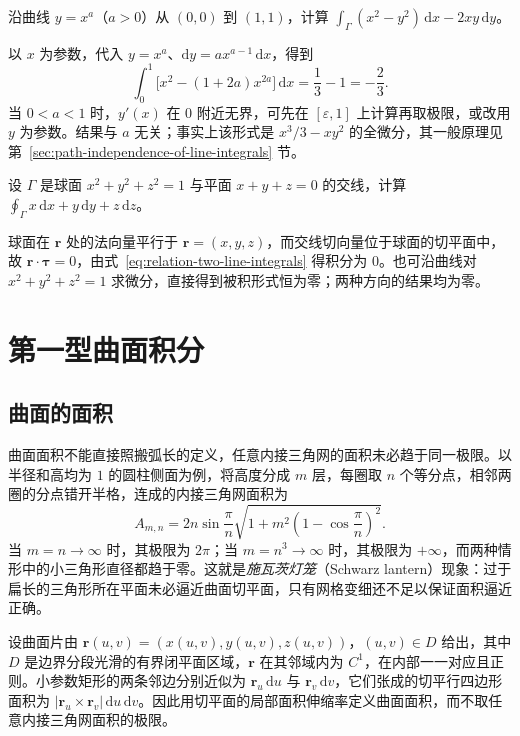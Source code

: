 \begin{example}
\label{ex:second-line-integral-variable-path}
沿曲线 $y=x^a$（$a>0$）从 $(0,0)$ 到 $(1,1)$，计算 $\int_\Gamma(x^2-y^2)\,\mathrm dx-2xy\,\mathrm dy$。
\end{example}
\begin{solve}
以 $x$ 为参数，代入 $y=x^a$、$\mathrm dy=ax^{a-1}\,\mathrm dx$，得到
\[
    \int_0^1\bigl[x^2-(1+2a)x^{2a}\bigr]\,\mathrm dx
    =\frac13-1=-\frac23.
\]
当 $0<a<1$ 时，$y'(x)$ 在 $0$ 附近无界，可先在 $[\varepsilon,1]$ 上计算再取极限，或改用 $y$ 为参数。结果与 $a$ 无关；事实上该形式是 $x^3/3-xy^2$ 的全微分，其一般原理见第~\ref{sec:path-independence-of-line-integrals} 节。
\end{solve}

\begin{example}
\label{ex:second-line-integral-sphere-circle}
设 $\Gamma$ 是球面 $x^2+y^2+z^2=1$ 与平面 $x+y+z=0$ 的交线，计算 $\oint_\Gamma x\,\mathrm dx+y\,\mathrm dy+z\,\mathrm dz$。
\end{example}
\begin{solve}
球面在 $\boldsymbol r$ 处的法向量平行于 $\boldsymbol r=(x,y,z)$，而交线切向量位于球面的切平面中，故 $\boldsymbol r\cdot\boldsymbol\tau=0$，由式~\eqref{eq:relation-two-line-integrals} 得积分为 $0$。也可沿曲线对 $x^2+y^2+z^2=1$ 求微分，直接得到被积形式恒为零；两种方向的结果均为零。
\end{solve}

\section{第一型曲面积分}
\label{sec:surface-integrals-of-the-first-kind}

\subsection{曲面的面积}
\label{subsec:surface-area}

曲面面积不能直接照搬弧长的定义，任意内接三角网的面积未必趋于同一极限。以半径和高均为 $1$ 的圆柱侧面为例，将高度分成 $m$ 层，每圈取 $n$ 个等分点，相邻两圈的分点错开半格，连成的内接三角网面积为
\[
    A_{m,n}=2n\sin\frac\pi n
    \sqrt{1+m^2\left(1-\cos\frac\pi n\right)^2}.
\]
当 $m=n\to\infty$ 时，其极限为 $2\pi$；当 $m=n^3\to\infty$ 时，其极限为 $+\infty$，而两种情形中的小三角形直径都趋于零。这就是\emph{施瓦茨灯笼}（Schwarz lantern）现象：过于扁长的三角形所在平面未必逼近曲面切平面，只有网格变细还不足以保证面积逼近正确。

设曲面片由 $\boldsymbol r(u,v)=(x(u,v),y(u,v),z(u,v))$，$(u,v)\in D$ 给出，其中 $D$ 是边界分段光滑的有界闭平面区域，$\boldsymbol r$ 在其邻域内为 $C^1$，在内部一一对应且正则。小参数矩形的两条邻边分别近似为 $\boldsymbol r_u\,\mathrm du$ 与 $\boldsymbol r_v\,\mathrm dv$，它们张成的切平行四边形面积为 $|\boldsymbol r_u\times\boldsymbol r_v|\,\mathrm du\,\mathrm dv$。因此用切平面的局部面积伸缩率定义曲面面积，而不取任意内接三角网面积的极限。

